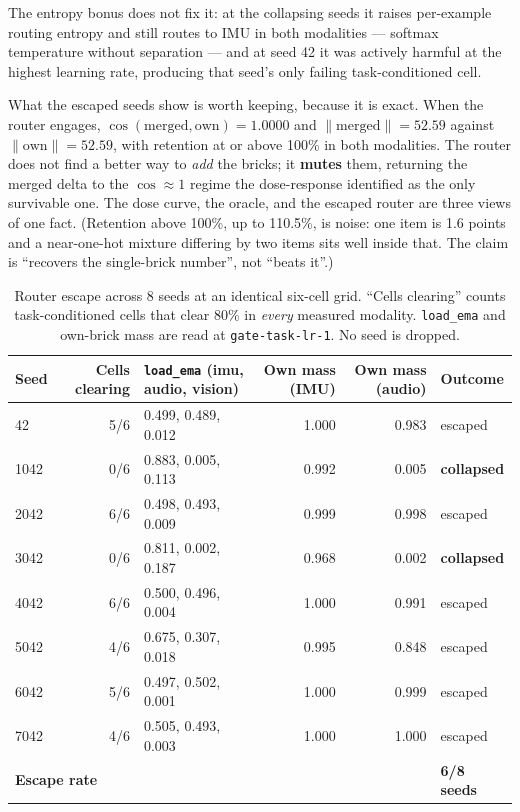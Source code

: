 \documentclass[11pt]{article}
\begin{document}
The entropy bonus does not fix it: at the collapsing seeds it raises per-example routing entropy and still routes to IMU in both modalities --- softmax temperature without separation --- and at seed 42 it was actively harmful at the highest learning rate, producing that seed's only failing task-conditioned cell.

What the escaped seeds show is worth keeping, because it is exact. When the router engages, $\cos(\mathrm{merged}, \mathrm{own}) = 1.0000$ and $\|\mathrm{merged}\| = 52.59$ against $\|\mathrm{own}\| = 52.59$, with retention at or above 100\% in both modalities. The router does not find a better way to \emph{add} the bricks; it \textbf{mutes} them, returning the merged delta to the $\cos \approx 1$ regime the dose-response identified as the only survivable one. The dose curve, the oracle, and the escaped router are three views of one fact. (Retention above 100\%, up to 110.5\%, is noise: one item is 1.6 points and a near-one-hot mixture differing by two items sits well inside that. The claim is ``recovers the single-brick number'', not ``beats it''.)

\begin{table}[t]
\centering
\caption{Router escape across 8 seeds at an identical six-cell grid. ``Cells clearing'' counts task-conditioned cells that clear 80\% in \emph{every} measured modality. \texttt{load\_ema} and own-brick mass are read at \texttt{gate-task-lr-1}. No seed is dropped.}
\label{tab:escape}
\footnotesize
\begin{tabular}{lrlrrl}
\toprule
Seed & Cells clearing & \texttt{load\_ema} (imu, audio, vision) & Own mass (IMU) & Own mass (audio) & Outcome \\
\midrule
42 & 5/6 & 0.499, 0.489, 0.012 & 1.000 & 0.983 & escaped \\
1042 & 0/6 & 0.883, 0.005, 0.113 & 0.992 & 0.005 & \textbf{collapsed} \\
2042 & 6/6 & 0.498, 0.493, 0.009 & 0.999 & 0.998 & escaped \\
3042 & 0/6 & 0.811, 0.002, 0.187 & 0.968 & 0.002 & \textbf{collapsed} \\
4042 & 6/6 & 0.500, 0.496, 0.004 & 1.000 & 0.991 & escaped \\
5042 & 4/6 & 0.675, 0.307, 0.018 & 0.995 & 0.848 & escaped \\
6042 & 5/6 & 0.497, 0.502, 0.001 & 1.000 & 0.999 & escaped \\
7042 & 4/6 & 0.505, 0.493, 0.003 & 1.000 & 1.000 & escaped \\
\midrule
\multicolumn{5}{l}{\textbf{Escape rate}} & \textbf{6/8 seeds} \\
\bottomrule
\end{tabular}
\end{table}
\end{document}
